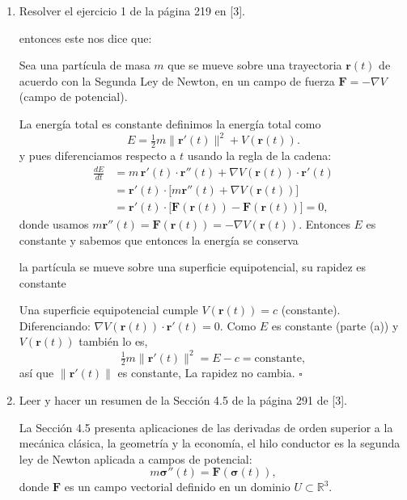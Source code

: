 \begin{enumerate}
    \item Resolver el ejercicio 1 de la página 219 en [3].

    \begin{respuesta}[title=P15.10]

entonces este nos dice que:

Sea una partícula de masa $m$ que se mueve sobre una trayectoria $\mathbf{r}(t)$
de acuerdo con la Segunda Ley de Newton, en un campo de fuerza
$\mathbf{F}=-\nabla V$ (campo de potencial).

La energía total es constante
definimos la energía total como
\[
  E = \tfrac{1}{2}m\|\mathbf{r}'(t)\|^2 + V(\mathbf{r}(t)).
\]
y pues diferenciamos respecto a $t$ usando la regla de la cadena:
\begin{align*}
  \frac{dE}{dt}
  &= m\,\mathbf{r}'(t)\cdot\mathbf{r}''(t)
    + \nabla V(\mathbf{r}(t))\cdot\mathbf{r}'(t) \\
  &= \mathbf{r}'(t)\cdot\bigl[m\mathbf{r}''(t) + \nabla V(\mathbf{r}(t))\bigr] \\
  &= \mathbf{r}'(t)\cdot\bigl[\mathbf{F}(\mathbf{r}(t)) - \mathbf{F}(\mathbf{r}(t))\bigr]
   = 0,
\end{align*}
donde usamos $m\mathbf{r}''(t)=\mathbf{F}(\mathbf{r}(t))=-\nabla V(\mathbf{r}(t))$.
Entonces $E$ es constante y sabemos que entonces la energía se conserva

la partícula se mueve sobre una superficie equipotencial, su rapidez es constante

Una superficie equipotencial cumple $V(\mathbf{r}(t))=c$ (constante).
Diferenciando: $\nabla V(\mathbf{r}(t))\cdot\mathbf{r}'(t)=0$.
Como $E$ es constante (parte (a)) y $V(\mathbf{r}(t))$ también lo es,
\[
  \tfrac{1}{2}m\|\mathbf{r}'(t)\|^2 = E - c = \text{constante},
\]
así que $\|\mathbf{r}'(t)\|$ es constante, La rapidez no cambia. $\square$
        \vspace{5cm}
    \end{respuesta}

    \item Leer y hacer un resumen de la Sección 4.5 de la página 291 de [3].

    \begin{respuesta}[title=P15.11]

La Sección 4.5 presenta aplicaciones de las derivadas de orden superior a la
mecánica clásica, la geometría y la economía, el hilo conductor es la
segunda ley de Newton aplicada a campos de potencial:
\[
  m\boldsymbol{\sigma}''(t) = \mathbf{F}(\boldsymbol{\sigma}(t)),
\]
donde $\mathbf{F}$ es un campo vectorial definido en un dominio $U\subset\mathbb{R}^3$.


\end{respuesta}
\end{enumerate}
